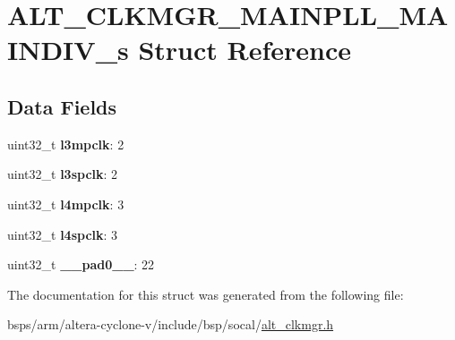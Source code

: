 \hypertarget{structALT__CLKMGR__MAINPLL__MAINDIV__s}{}\section{A\+L\+T\+\_\+\+C\+L\+K\+M\+G\+R\+\_\+\+M\+A\+I\+N\+P\+L\+L\+\_\+\+M\+A\+I\+N\+D\+I\+V\+\_\+s Struct Reference}
\label{structALT__CLKMGR__MAINPLL__MAINDIV__s}
\subsection*{Data Fields}
\begin{DoxyCompactItemize}
\item 
\mbox{\label{structALT__CLKMGR__MAINPLL__MAINDIV__s_a7d13a394dca91e37c9a48afce2fc136e}} 
uint32\+\_\+t {\bfseries l3mpclk}\+: 2
\item 
\mbox{\label{structALT__CLKMGR__MAINPLL__MAINDIV__s_a574b33d1e42519e2ba406027e6dfe92b}} 
uint32\+\_\+t {\bfseries l3spclk}\+: 2
\item 
\mbox{\label{structALT__CLKMGR__MAINPLL__MAINDIV__s_aa0c6ef46522a5e4c6b854196bfa949e0}} 
uint32\+\_\+t {\bfseries l4mpclk}\+: 3
\item 
\mbox{\label{structALT__CLKMGR__MAINPLL__MAINDIV__s_a46a19cf6983f211187740c2ff45dd40d}} 
uint32\+\_\+t {\bfseries l4spclk}\+: 3
\item 
\mbox{\label{structALT__CLKMGR__MAINPLL__MAINDIV__s_aa293f93fece224706a7636e201f81090}} 
uint32\+\_\+t {\bfseries \+\_\+\+\_\+pad0\+\_\+\+\_\+}\+: 22
\end{DoxyCompactItemize}


The documentation for this struct was generated from the following file\+:\begin{DoxyCompactItemize}
\item 
bsps/arm/altera-\/cyclone-\/v/include/bsp/socal/\mbox{\hyperlink{alt__clkmgr_8h}{alt\+\_\+clkmgr.\+h}}\end{DoxyCompactItemize}
